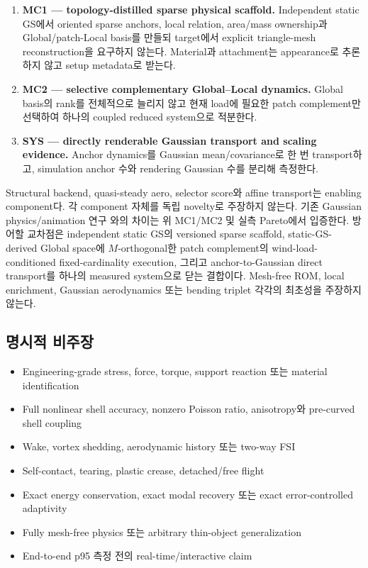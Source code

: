 \documentclass[11pt]{article}
\begin{document}
\begin{enumerate}
  \item \textbf{MC1 --- topology-distilled sparse physical scaffold.}
  Independent static GS에서 oriented sparse anchors, local relation, area/mass ownership과
  Global/patch-Local basis를 만들되 target에서 explicit triangle-mesh reconstruction을 요구하지 않는다.
  Material과 attachment는 appearance로 추론하지 않고 setup metadata로 받는다.
  \item \textbf{MC2 --- selective complementary Global--Local dynamics.}
  Global basis의 rank를 전체적으로 늘리지 않고 현재 load에 필요한 patch complement만 선택하여
  하나의 coupled reduced system으로 적분한다.
  \item \textbf{SYS --- directly renderable Gaussian transport and scaling evidence.}
  Anchor dynamics를 Gaussian mean/covariance로 한 번 transport하고,
  simulation anchor 수와 rendering Gaussian 수를 분리해 측정한다.
\end{enumerate}

Structural backend, quasi-steady aero, selector score와 affine transport는 enabling component다.
각 component 자체를 독립 novelty로 주장하지 않는다.
기존 Gaussian physics/animation 연구 \cite{xie2024physgaussian,yan2026gaussianswaying,
lei2026diffwind,ma2026fastphysgs}와의 차이는 위 MC1/MC2 및 실측 Pareto에서 입증한다.
방어할 교차점은 independent static GS의 versioned sparse scaffold, static-GS-derived Global space에
\(M\)-orthogonal한 patch complement의 wind-load-conditioned fixed-cardinality execution,
그리고 anchor-to-Gaussian direct transport를 하나의 measured system으로 닫는 결합이다.
Mesh-free ROM, local enrichment, Gaussian aerodynamics 또는 bending triplet 각각의 최초성을 주장하지 않는다.

\subsection{명시적 비주장}

\begin{itemize}
  \item Engineering-grade stress, force, torque, support reaction 또는 material identification
  \item Full nonlinear shell accuracy, nonzero Poisson ratio, anisotropy와 pre-curved shell coupling
  \item Wake, vortex shedding, aerodynamic history 또는 two-way FSI
  \item Self-contact, tearing, plastic crease, detached/free flight
  \item Exact energy conservation, exact modal recovery 또는 exact error-controlled adaptivity
  \item Fully mesh-free physics 또는 arbitrary thin-object generalization
  \item End-to-end p95 측정 전의 real-time/interactive claim
\end{itemize}
\end{document}
